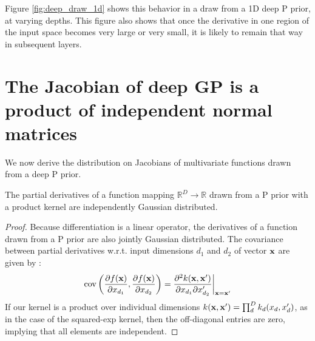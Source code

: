 \documentclass[twoside]{article}
\makeatletter
\newlength{\nonHumbleHeight}
\def\@humbleformat#1{{\settoheight{\nonHumbleHeight}{#1}\resizebox{!}{0.94\nonHumbleHeight}{#1}}}%
\def\humble#1{\@humbleformat{#1}}%
\newcommand{\gp}{{\humble GP}}
\newcommand{\sectiondist}{}
\makeatother
\begin{document}
Figure \ref{fig:deep_draw_1d} shows this behavior in a draw from a 1D deep \gp{} prior, at varying depths.  This figure also shows that once the derivative in one region of the input space becomes very large or very small, it is likely to remain that way in subsequent layers.
%
%









\section{The Jacobian of deep GP is a product of independent normal matrices}
\sectiondist
\label{sec:theorem}

We now derive the distribution on Jacobians of multivariate functions drawn from a deep \gp{} prior.

\begin{lemma}
\label{thm:deriv-ind}
The partial derivatives of a function mapping $\mathbb{R}^D \rightarrow \mathbb{R}$ drawn from a \gp{} prior with a product kernel are independently Gaussian distributed.
\end{lemma}
%
\begin{proof}
Because differentiation is a linear operator, the derivatives of a function drawn from a \gp{} prior are also jointly Gaussian distributed.  The covariance between partial derivatives w.r.t. input dimensions $d_1$ and $d_2$ of vector ${\bf{x}}$ are given by \citet{Solak03derivativeobservations}:
%
\begin{align}
\operatorname{cov} \left( \frac{\partial f({\bf{x}})}{\partial x_{d_1}}, \frac{\partial f({\bf{x}})}{\partial x_{d_2}} \right) 
= \frac{\partial^2 k({\bf{x}}, {\bf{x}}')}{\partial x_{d_1} \partial x_{d_2}'} \bigg|_{{\bf{x}}={\bf{x}}'}
\end{align}
%
If our kernel is a product over individual dimensions $k({\bf{x}}, {\bf{x}}') = \prod_d^D k_d(x_d, x_d')$, as in the case of the squared-exp kernel, then the off-diagonal entries are zero, implying that all elements are independent.
\end{proof}
\end{document}

